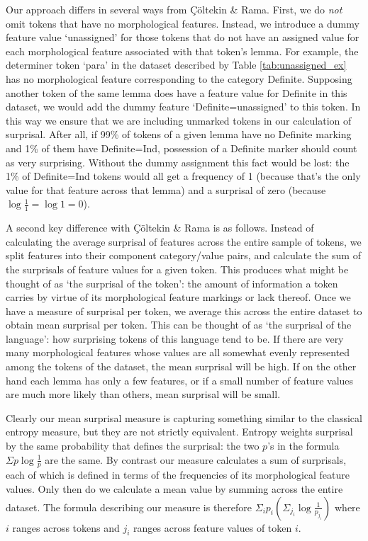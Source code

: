 \documentclass[USenglish]{article}
\begin{document}
Our approach differs in several ways from Çöltekin \& Rama.
First, we do \textit{not} omit tokens that have no morphological features.
Instead, we introduce a dummy feature value `unassigned' for those tokens that do not have an assigned value for each morphological feature associated with that token's lemma.
For example, the determiner token `para' in the dataset described by Table \ref{tab:unassigned_ex} has no morphological feature corresponding to the category Definite.
Supposing another token of the same lemma does have a feature value for Definite in this dataset, we would add the dummy feature `Definite=unassigned' to this token.
In this way we ensure that we are including unmarked tokens in our calculation of surprisal.
After all, if 99\% of tokens of a given lemma have no Definite marking and 1\% of them have Definite=Ind, possession of a Definite marker should count as very surprising.
Without the dummy assignment this fact would be lost: the 1\% of Definite=Ind tokens would all get a frequency of 1 (because that's the only value for that feature across that lemma) and a surprisal of zero (because $\log{\frac{1}{1}}=\log{1}=0$).

A second key difference with Çöltekin \& Rama is as follows.
Instead of calculating the average surprisal of features across the entire sample of tokens, we split features into their component category/value pairs, and calculate the sum of the surprisals of feature values for a given token.
This produces what might be thought of as `the surprisal of the token': the amount of information a token carries by virtue of its morphological feature markings or lack thereof.
Once we have a measure of surprisal per token, we average this across the entire dataset to obtain mean surprisal per token.
This can be thought of as `the surprisal of the language': how surprising tokens of this language tend to be.
If there are very many morphological features whose values are all somewhat evenly represented among the tokens of the dataset, the mean surprisal will be high.
If on the other hand each lemma has only a few features, or if a small number of feature values are much more likely than others, mean surprisal will be small.

Clearly our mean surprisal measure is capturing something similar to the classical entropy measure, but they are not strictly equivalent.
Entropy weights surprisal by the same probability that defines the surprisal: the two $p$'s in the formula $\Sigma p\log{\frac{1}{p}}$ are the same.
By contrast our measure calculates a sum of surprisals, each of which is defined in terms of the frequencies of its morphological feature values.
Only then do we calculate a mean value by summing across the entire dataset.
The formula describing our measure is therefore $\Sigma_i p_i \left( \Sigma_{j_i} \log{\frac{1}{p_{j_i}}} \right)$ where $i$ ranges across tokens and $j_i$ ranges across feature values of token $i$.
\end{document}
